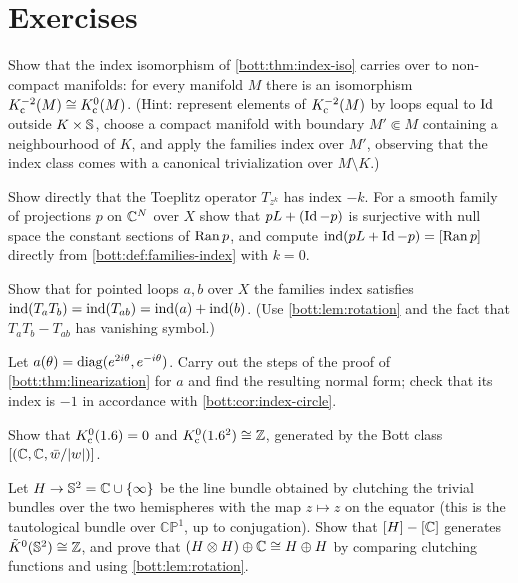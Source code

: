 \section{Exercises}

\begin{exercise}\label{bott:ex:noncompact}
  Show that the index isomorphism of \cref{bott:thm:index-iso} carries over to non-compact
  manifolds: for every manifold $M$ there is an isomorphism $K_{\mathrm{c}}^{-2}(M)\cong K_{\mathrm{c}}^0(M)$.
  (Hint: represent elements of $K_{\mathrm{c}}^{-2}(M)$ by loops equal to $\operatorname{Id}$ outside $K\times\mathbb{S}$, choose
  a compact manifold with boundary $M'\Subset M$ containing a neighbourhood of $K$, and apply the
  families index over $M'$, observing that the index class comes with a canonical trivialization
  over $M\setminus K$.)
\end{exercise}

\begin{exercise}\label{bott:ex:shift-index}
  Show directly that the Toeplitz operator $T_{z^k}$ has index $-k$. For a smooth family of
  projections $p$ on $\mathbb{C}^N$ over $X$ show that $pL+(\operatorname{Id}-p)$ is surjective with null space
  the constant sections of $\operatorname{Ran} p$, and compute $\operatorname{ind}(pL+\operatorname{Id}-p)=[\operatorname{Ran} p]$ directly from
  \cref{bott:def:families-index} with $k=0$.
\end{exercise}

\begin{exercise}\label{bott:ex:product-index}
  Show that for pointed loops $a,b$ over $X$ the families index satisfies
  $\operatorname{ind}(T_aT_b)=\operatorname{ind}(T_{ab})=\operatorname{ind}(a)+\operatorname{ind}(b)$. (Use \cref{bott:lem:rotation} and the fact that
  $T_aT_b-T_{ab}$ has vanishing symbol.)
\end{exercise}

\begin{exercise}\label{bott:ex:linearize-example}
  Let $a(\theta)=\operatorname{diag}(e^{2i\theta},e^{-i\theta})$. Carry out the steps of the proof of
  \cref{bott:thm:linearization} for $a$ and find the resulting normal form; check that its index
  is $-1$ in accordance with \cref{bott:cor:index-circle}.
\end{exercise}

\begin{exercise}\label{bott:ex:Kc-line-plane}
  Show that $K_{\mathrm{c}}^0(1.6)=0$ and $K_{\mathrm{c}}^0(1.6^2)\cong\mathbb{Z}$, generated by the Bott class
  $[(\mathbb{C},\mathbb{C},\bar w/|w|)]$.
\end{exercise}

\begin{exercise}\label{bott:ex:hopf}
  Let $H\to\mathbb{S}^2=\mathbb{C}\cup\{\infty\}$ be the line bundle obtained by clutching the trivial bundles
  over the two hemispheres with the map $z\mapsto z$ on the equator (this is the tautological
  bundle over $\mathbb{CP}^1$, up to conjugation). Show that $[H]-[\mathbb{C}]$ generates
  $\tilde K^0(\mathbb{S}^2)\cong\mathbb{Z}$, and prove that $(H\otimes H)\oplus\mathbb{C}\cong H\oplus H$ by comparing
  clutching functions and using \cref{bott:lem:rotation}.
\end{exercise}

